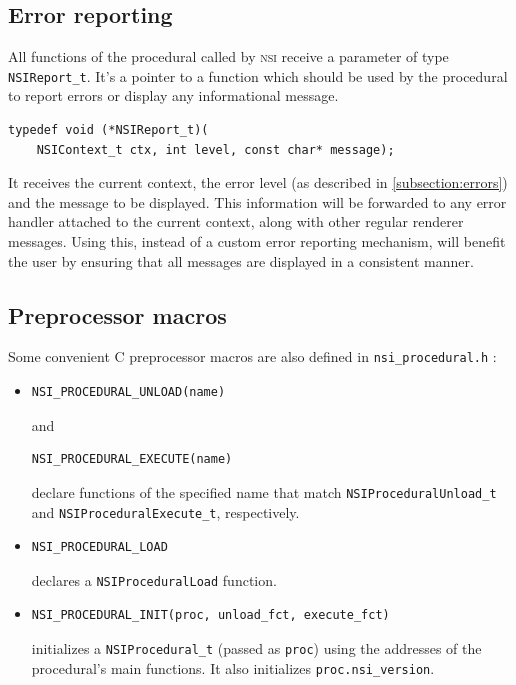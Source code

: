 \documentclass[oneside,ebook]{memoir}
\newcommand*{\acronym}[1]{\textsc{\lowercase{#1}}}
\begin{document}
\subsection{Error reporting}
All functions of the procedural called by \acronym{NSI} receive a parameter of type \lstinline|NSIReport_t|.
It's a pointer to a function which should be used by the procedural to report errors or display any informational message.
\begin{lstlisting}[style=CAPI]
typedef void (*NSIReport_t)(
	NSIContext_t ctx, int level, const char* message);
\end{lstlisting}
It receives the current context, the error level (as described in \autoref{subsection:errors}) and the message to be displayed.
This information will be forwarded to any error handler attached to the current context, along with other regular renderer messages.
Using this, instead of a custom error reporting mechanism, will benefit the user by ensuring that all messages are displayed in a consistent manner.

\subsection{Preprocessor macros}
Some convenient C preprocessor macros are also defined in \lstinline|nsi_procedural.h| :

\begin{itemize}
\item
\begin{lstlisting}[style=CAPI]
NSI_PROCEDURAL_UNLOAD(name)
\end{lstlisting}
and
\begin{lstlisting}[style=CAPI]
NSI_PROCEDURAL_EXECUTE(name)
\end{lstlisting}
declare functions of the specified name that match \lstinline|NSIProceduralUnload_t| and \lstinline|NSIProceduralExecute_t|, respectively.
\item
\begin{lstlisting}[style=CAPI]
NSI_PROCEDURAL_LOAD
\end{lstlisting}
declares a \lstinline|NSIProceduralLoad| function.
\item
\begin{lstlisting}[style=CAPI]
NSI_PROCEDURAL_INIT(proc, unload_fct, execute_fct)
\end{lstlisting}
initializes a \lstinline|NSIProcedural_t| (passed as \lstinline|proc|) using the addresses of the procedural's main functions.
It also initializes \lstinline|proc.nsi_version|.
\end{itemize}
\end{document}
